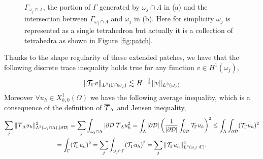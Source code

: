 
\begin{figure}\label{fig:gamma_generated}
\centering
{}
\qquad \qquad
{}
\caption{$\Gamma_{\omega_j \cap \Lambda}$, the portion of $\Gamma$ generated by $\omega_j \cap \Lambda$ in (a) and the intersection between $\Gamma_{\omega_j \cap \Lambda}$ and $\omega_j$ in (b). Here for simplicity $\omega_j$ is represented as a single tetrahedron but actually it is a collection of tetrahedra as shown in Figure \ref{fig:patch}.}
\end{figure}

Thanks to the shape regularity of these extended patches, we have that the following discrete trace inequality holds true for any function $v\in H^1(\omega_j)$, 
\begin{equation}\label{discr_trace_ineq}
\|\trace v\|_{L^2(\Gamma\cap \omega_j)} \lesssim H^{-\frac 12} \|v\|_{L^2(\omega_j)}
\end{equation}
Moreover $\forall u_h \in X^1_{h,0}(\Omega)$ we have the following average inequality, which is a consequence of the definition of ${\overline{\mathcal{T}}_\Lambda}$ and Jensen inequality,
\begin{multline}\label{eq:avrg_ineq}
\sum _j \|\mtrace u_h\|^2_{L^2(\patch \cap \Lambda),|\DD| }
= \sum _j\int_{\patch \cap \Lambda} |\DD| \mtrace u_h^2 
= \int_{\Lambda} |\DD| \left( \frac{1}{|\DD|} \int_{\DD} \trace u_h \right)^2
\leq \int_{\Lambda} \int_{\DD} (\trace u_h)^2
\\
= \int_{\Gamma} (\trace u_h)^2
= \sum _j \int_{\patch \cap \Gamma} (\trace u_h)^2
= \sum _j \|\trace u_h\|^2_{L^2(\patch \cap \Gamma)}.
\end{multline}

